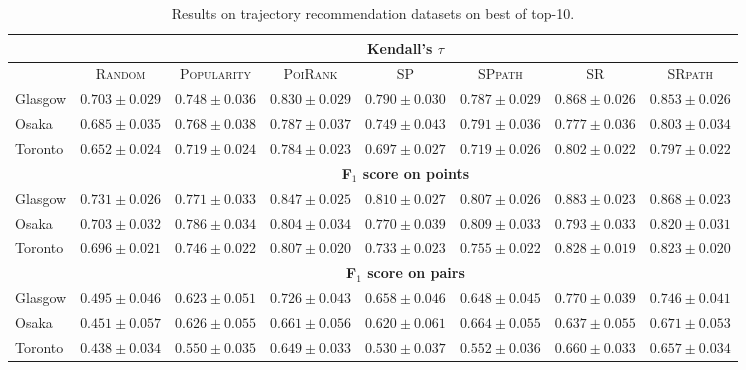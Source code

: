 \begin{table*}[!h]
\caption{Results on trajectory recommendation datasets on best of top-10.}
\centering
\scriptsize
\setlength{\tabcolsep}{3pt} %
\begin{tabular}{l|cc|cc|ccc} \hline
& \multicolumn{7}{c}{\bf Kendall's $\tau$} \\ \hline
 & \textsc{Random} & \textsc{Popularity} & \textsc{PoiRank} & \textsc{SP} & \textsc{SPpath} & \textsc{SR} & \textsc{SRpath} \\ \hline
Glasgow & $0.703\pm0.029$ & $0.748\pm0.036$ & $0.830\pm0.029$ & $0.790\pm0.030$ & $0.787\pm0.029$ & $\mathbf{0.868\pm0.026}$ & $\mathit{0.853\pm0.026}$ \\
Osaka & $0.685\pm0.035$ & $0.768\pm0.038$ & $0.787\pm0.037$ & $0.749\pm0.043$ & $\mathit{0.791\pm0.036}$ & $0.777\pm0.036$ & $\mathbf{0.803\pm0.034}$ \\
Toronto & $0.652\pm0.024$ & $0.719\pm0.024$ & $0.784\pm0.023$ & $0.697\pm0.027$ & $0.719\pm0.026$ & $\mathbf{0.802\pm0.022}$ & $\mathit{0.797\pm0.022}$ \\
\hline
& \multicolumn{7}{c}{\bf F$_1$ score on points} \\ \hline
Glasgow & $0.731\pm0.026$ & $0.771\pm0.033$ & $0.847\pm0.025$ & $0.810\pm0.027$ & $0.807\pm0.026$ & $\mathbf{0.883\pm0.023}$ & $\mathit{0.868\pm0.023}$ \\
Osaka & $0.703\pm0.032$ & $0.786\pm0.034$ & $0.804\pm0.034$ & $0.770\pm0.039$ & $\mathit{0.809\pm0.033}$ & $0.793\pm0.033$ & $\mathbf{0.820\pm0.031}$ \\
Toronto & $0.696\pm0.021$ & $0.746\pm0.022$ & $0.807\pm0.020$ & $0.733\pm0.023$ & $0.755\pm0.022$ & $\mathbf{0.828\pm0.019}$ & $\mathit{0.823\pm0.020}$ \\
\hline
& \multicolumn{7}{c}{\bf F$_1$ score on pairs} \\ \hline
Glasgow & $0.495\pm0.046$ & $0.623\pm0.051$ & $0.726\pm0.043$ & $0.658\pm0.046$ & $0.648\pm0.045$ & $\mathbf{0.770\pm0.039}$ & $\mathit{0.746\pm0.041}$ \\
Osaka & $0.451\pm0.057$ & $0.626\pm0.055$ & $0.661\pm0.056$ & $0.620\pm0.061$ & $\mathit{0.664\pm0.055}$ & $0.637\pm0.055$ & $\mathbf{0.671\pm0.053}$ \\
Toronto & $0.438\pm0.034$ & $0.550\pm0.035$ & $0.649\pm0.033$ & $0.530\pm0.037$ & $0.552\pm0.036$ & $\mathbf{0.660\pm0.033}$ & $\mathit{0.657\pm0.034}$ \\
\hline
\end{tabular}
\end{table*}
